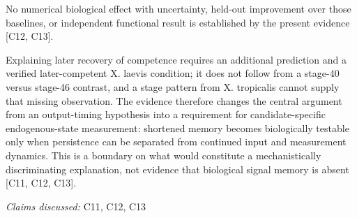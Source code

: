 \documentclass[11pt]{article}
\begin{document}
No numerical biological effect with uncertainty, held-out improvement over those baselines, or independent functional result is established by the present evidence [C12, C13].

Explaining later recovery of competence requires an additional prediction and a verified later-competent X. laevis condition; it does not follow from a stage-40 versus stage-46 contrast, and a stage pattern from X. tropicalis cannot supply that missing observation. The evidence therefore changes the central argument from an output-timing hypothesis into a requirement for candidate-specific endogenous-state measurement: shortened memory becomes biologically testable only when persistence can be separated from continued input and measurement dynamics. This is a boundary on what would constitute a mechanistically discriminating explanation, not evidence that biological signal memory is absent [C11, C12, C13].

\textit{Claims discussed: }C11, C12, C13
\end{document}
